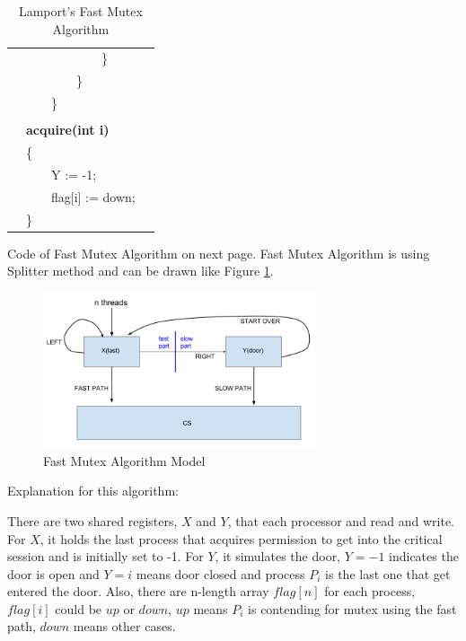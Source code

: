 \documentclass[twoside]{article}
\newcounter{magicrownumbers}
\newcommand\rownumber{\stepcounter{magicrownumbers}\arabic{magicrownumbers}}
\begin{document}
\begin{table}[!ht]
\begin{tabular}{l  l  l }
        \rownumber & \ \ \ \ \ \ \ \ \ \ \ \ \} \\
        \rownumber & \ \ \ \ \ \ \ \ \} \\
        \rownumber & \ \ \ \ \} \\
        \rownumber &  \\
        \rownumber & \textbf{acquire(int i)} \\
        \rownumber & \{ \\
        \rownumber & \ \ \ \ Y := -1; \\
        \rownumber & \ \ \ \ flag[i] := down; \\
        \rownumber & \} \\
        \hline
    \end{tabular}
    \caption*{Lamport's Fast Mutex Algorithm}
\end{table}
\setcounter{magicrownumbers}{0}

Code of Fast Mutex Algorithm on next page. Fast Mutex Algorithm is using Splitter method and can be drawn like Figure \ref{model}.

\begin{figure}[!ht]
  \centering
    \includegraphics[width=0.72\textwidth]{1.png}
  \caption{Fast Mutex Algorithm Model}
    \label{model}
\end{figure}

Explanation for this algorithm:

There are two shared registers, $X$ and $Y$, that each processor and read and write. For $X$, it holds the last process that acquires permission to get into the critical session and is initially set to -1. For $Y$, it simulates the door, $Y = -1$ indicates the door is open and $Y = i$ means door closed and process $P_i$ is the last one that get entered the door. Also, there are n-length array $flag[n]$ for each process, $flag[i]$ could be $up$ or $down$, $up$ means $P_i$ is contending for mutex using the fast path, $down$ means other cases.
\end{document}
